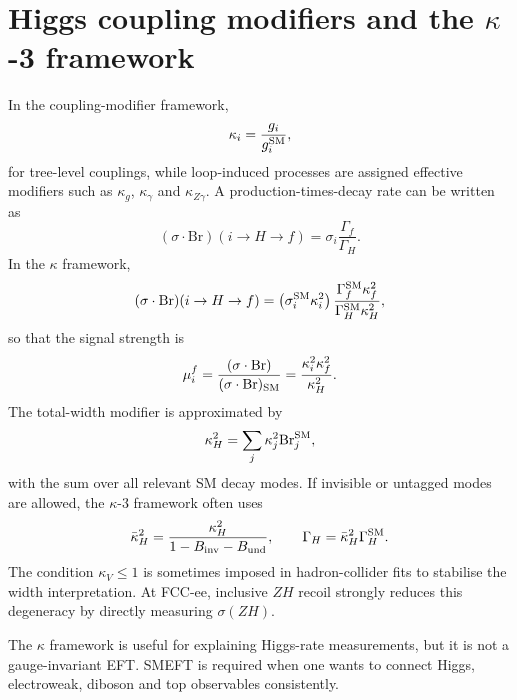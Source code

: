 \documentclass[11pt,a4paper]{report}
\newcommand{\br}{\mathrm{Br}}
\begin{document}
\section{Higgs coupling modifiers and the $\kappa$-3 framework}
In the coupling-modifier framework,
\begin{equation}
  \kappa_i=\frac{g_i}{g_i^{\rm SM}},
\end{equation}
for tree-level couplings, while loop-induced processes are assigned effective modifiers such as $\kappa_g$, $\kappa_\gamma$ and $\kappa_{Z\gamma}$.  A production-times-decay rate can be written as
\begin{equation}
  (\sigma\cdot \br)(i\to H\to f)=\sigma_i\frac{\Gamma_f}{\Gamma_H}.
\end{equation}
In the $\kappa$ framework,
\begin{equation}
  (\sigma\cdot \br)(i\to H\to f)
  =\left(\sigma_i^{\rm SM}\kappa_i^2\right)
  \frac{\Gamma_f^{\rm SM}\kappa_f^2}{\Gamma_H^{\rm SM}\kappa_H^2},
\end{equation}
so that the signal strength is
\begin{equation}
  \mu_i^f=\frac{(\sigma\cdot \br)}{(\sigma\cdot \br)_{\rm SM}}
  =\frac{\kappa_i^2\kappa_f^2}{\kappa_H^2}.
\end{equation}
The total-width modifier is approximated by
\begin{equation}
  \kappa_H^2=\sum_j \kappa_j^2\br_j^{\rm SM},
\end{equation}
with the sum over all relevant SM decay modes.  If invisible or untagged modes are allowed, the $\kappa$-3 framework often uses
\begin{equation}
  \bar\kappa_H^2=\frac{\kappa_H^2}{1-B_{\rm inv}-B_{\rm und}},
  \qquad
  \Gamma_H=\bar\kappa_H^2\Gamma_H^{\rm SM}.
\end{equation}
The condition $\kappa_V\leq1$ is sometimes imposed in hadron-collider fits to stabilise the width interpretation.  At FCC-ee, inclusive $ZH$ recoil strongly reduces this degeneracy by directly measuring $\sigma(ZH)$.

\begin{warningbox}
The $\kappa$ framework is useful for explaining Higgs-rate measurements, but it is not a gauge-invariant EFT.  SMEFT is required when one wants to connect Higgs, electroweak, diboson and top observables consistently.
\end{warningbox}
\end{document}
